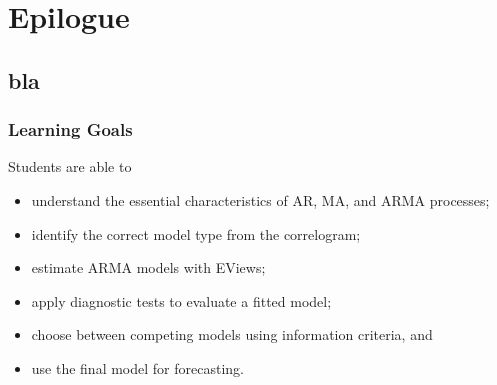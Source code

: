 \section{Epilogue}\subsection*{bla}
\begin{frame}\frametitle{Learning Goals}
Students are able to
\begin{itemize}
\item understand the essential characteristics of AR, MA, and ARMA processes;
\item identify the correct model type from the correlogram;
\item estimate ARMA models with EViews;
\item apply diagnostic tests to evaluate a fitted model;
\item choose between competing models using information criteria, and
\item use the final model for forecasting.
\end{itemize}
\end{frame}

 